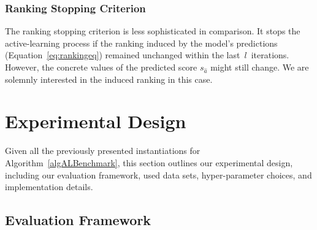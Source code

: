 \documentclass[sn-basic, Numbered]{sn-jnl} %
\begin{document}
\subsubsection{Ranking Stopping Criterion}

The ranking stopping criterion is less sophisticated in comparison.
It stops the active-learning process if the ranking induced by the model's predictions (Equation~\ref{eq:rankingeq}) remained unchanged within the last~$l$~iterations.
However, the concrete values of the predicted score $s_{\hat a}$ might still change.
We are solemnly interested in the induced ranking in this case.


\section{Experimental Design}
\label{sec:exdesign}

Given all the previously presented instantiations for Algorithm~\ref{algALBenchmark}, this section outlines our experimental design, including our evaluation framework, used data sets, hyper-parameter choices, and implementation details.

\subsection{Evaluation Framework}
\label{sec:exdesign:eval}
\end{document}
